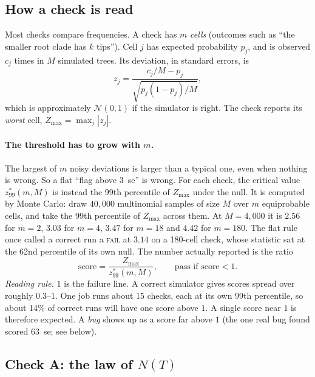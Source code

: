 \documentclass[11pt]{article}
\begin{document}
\subsection{How a check is read}\label{sec:reading}

Most checks compare frequencies. A check has $m$ \emph{cells} (outcomes such as ``the smaller root
clade has $k$ tips''). Cell $j$ has expected probability $p_j$, and is observed $c_j$ times in $M$
simulated trees. Its deviation, in standard errors, is
\begin{equation}
  z_j = \frac{c_j/M - p_j}{\sqrt{p_j(1-p_j)/M}} ,
  \label{eq:z}
\end{equation}
which is approximately $\mathcal{N}(0,1)$ if the simulator is right. The check reports its
\emph{worst} cell, $Z_{\max}=\max_j |z_j|$.

\paragraph{The threshold has to grow with $m$.} The largest of $m$ noisy deviations is larger than a
typical one, even when nothing is wrong. So a flat ``flag above 3~se'' is wrong. For each check, the
critical value $z^{*}_{99}(m,M)$ is instead the 99th percentile of $Z_{\max}$ under the null. It is
computed by Monte Carlo: draw $40{,}000$ multinomial samples of size $M$ over $m$ equiprobable
cells, and take the 99th percentile of $Z_{\max}$ across them. At $M=4{,}000$ it is $2.56$ for
$m=2$, $3.03$ for $m=4$, $3.47$ for $m=18$ and $4.42$ for $m=180$. The flat rule once called a
correct run a \textsc{fail} at $3.14$ on a 180-cell check, whose statistic sat at the 62nd
percentile of its own null. The number actually reported is the ratio
\begin{equation}
  \text{score} = \frac{Z_{\max}}{z^{*}_{99}(m,M)} ,
  \qquad \text{pass if score} < 1 .
  \label{eq:score}
\end{equation}
\emph{Reading rule.} $1$ is the failure line. A correct simulator gives scores spread over roughly
$0.3$--$1$. One job runs about 15 checks, each at its own 99th percentile, so about 14\% of correct
runs will have one score above $1$. A single score near $1$ is therefore expected. A \emph{bug}
shows up as a score far above $1$ (the one real bug found scored 63~se; see below).

\subsection{\texorpdfstring{Check A: the law of $N(T)$}{Check A: the law of N(T)}}
\end{document}
